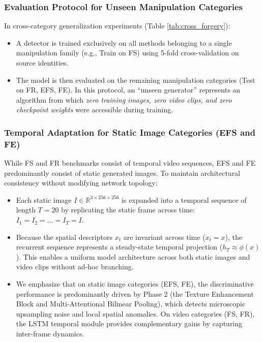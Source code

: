 \subsubsection{Evaluation Protocol for Unseen Manipulation Categories}
In cross-category generalization experiments (Table \ref{tab:cross_forgery}):
\begin{itemize}
    \item A detector is trained exclusively on all methods belonging to a single manipulation family (e.g., Train on FS) using 5-fold cross-validation on source identities.
    \item The model is then evaluated on the remaining manipulation categories (Test on FR, EFS, FE). In this protocol, an ``unseen generator'' represents an algorithm from which \textit{zero training images, zero video clips, and zero checkpoint weights} were accessible during training.
\end{itemize}

\subsubsection{Temporal Adaptation for Static Image Categories (EFS and FE)}
While FS and FR benchmarks consist of temporal video sequences, EFS and FE predominantly consist of static generated images. To maintain architectural consistency without modifying network topology:
\begin{itemize}
    \item Each static image $I \in \mathbb{R}^{3 \times 256 \times 256}$ is expanded into a temporal sequence of length $T=20$ by replicating the static frame across time: $I_1 = I_2 = \dots = I_T = I$.
    \item Because the spatial descriptors $x_t$ are invariant across time ($x_t = x$), the recurrent sequence represents a steady-state temporal projection ($h_T \approx \phi(x)$). This enables a uniform model architecture across both static images and video clips without ad-hoc branching.
    \item We emphasize that on static image categories (EFS, FE), the discriminative performance is predominantly driven by Phase 2 (the Texture Enhancement Block and Multi-Attentional Bilinear Pooling), which detects microscopic upsampling noise and local spatial anomalies. On video categories (FS, FR), the LSTM temporal module provides complementary gains by capturing inter-frame dynamics.
\end{itemize}

